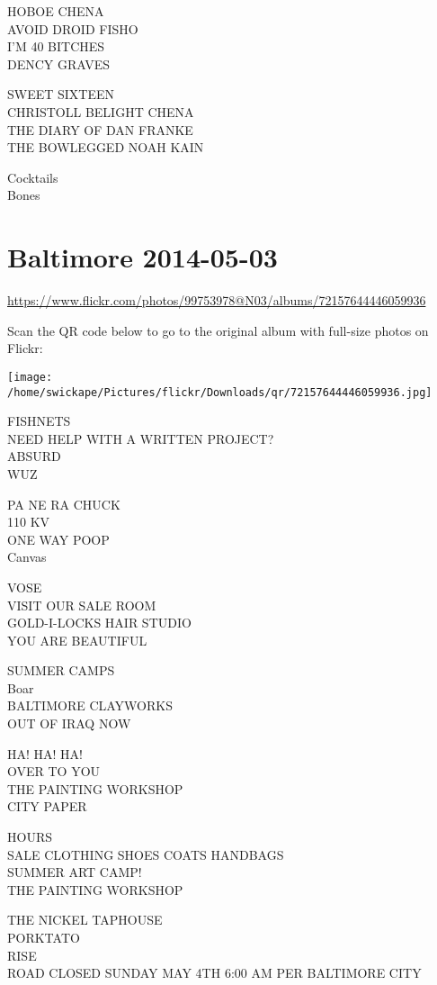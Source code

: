 \documentclass[10pt,letterpaper]{article}
\begin{document}
HOBOE CHENA\\
AVOID DROID FISHO\\
I'M 40 BITCHES\\
DENCY GRAVES

SWEET SIXTEEN\\
CHRISTOLL BELIGHT CHENA\\
THE DIARY OF DAN FRANKE\\
THE BOWLEGGED NOAH KAIN

Cocktails\\
Bones


\section*{Baltimore 2014-05-03}

\url{https://www.flickr.com/photos/99753978@N03/albums/72157644446059936}

Scan the QR code below to go to the original album with full-size photos on Flickr:

\texttt{[image: /home/swickape/Pictures/flickr/Downloads/qr/72157644446059936.jpg]}


FISHNETS\\
NEED HELP WITH A WRITTEN PROJECT?\\
ABSURD\\
WUZ

PA NE RA CHUCK\\
110 KV\\
ONE WAY POOP\\
Canvas

VOSE\\
VISIT OUR SALE ROOM\\
GOLD{-}I{-}LOCKS HAIR STUDIO\\
YOU ARE BEAUTIFUL

SUMMER CAMPS\\
Boar\\
BALTIMORE CLAYWORKS\\
OUT OF IRAQ NOW

HA! HA! HA!\\
OVER TO YOU\\
THE PAINTING WORKSHOP\\
CITY PAPER

HOURS\\
SALE CLOTHING SHOES COATS HANDBAGS\\
SUMMER ART CAMP!\\
THE PAINTING WORKSHOP

THE NICKEL TAPHOUSE\\
PORKTATO\\
RISE\\
ROAD CLOSED SUNDAY MAY 4TH 6:00 AM PER BALTIMORE CITY
\end{document}

